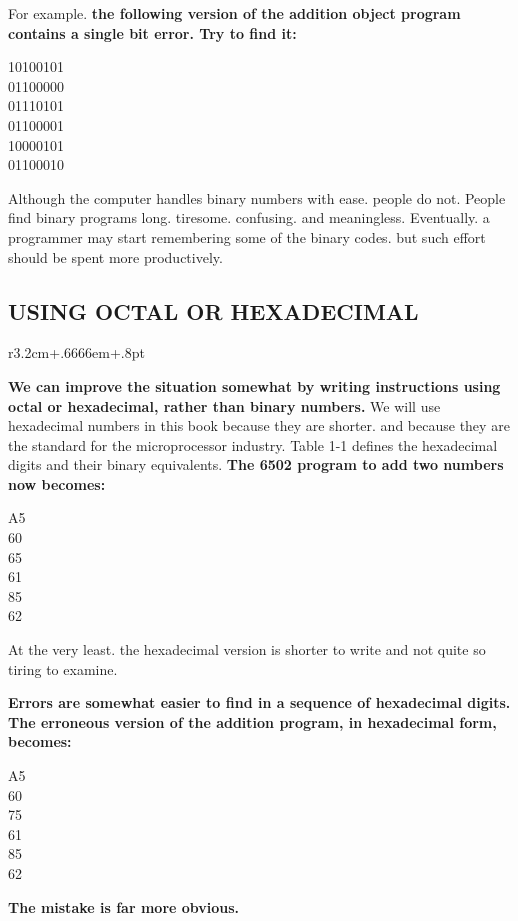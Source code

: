 \documentclass{book}
\begin{document}
For example. \textbf{the following version of the addition object program contains a single bit error. Try to find it:}
\begin{center}
10100101\\
01100000\\
01110101\\
01100001\\
10000101\\
01100010
\end{center}
Although the computer handles binary numbers with ease. people do not. People find binary programs long. tiresome. confusing. and meaningless. Eventually. a programmer may start remembering some of the binary codes. but such effort should be spent more productively.

\subsection*{USING OCTAL OR HEXADECIMAL}
\begin{wrapfigure}{r}{3.2cm+.6666em+.8pt}
\end{wrapfigure}
\textbf{We can improve the situation somewhat by writing instructions using octal or hexadecimal, rather than binary numbers.} We will use hexadecimal numbers in this book because they are shorter. and because they are the standard for the microprocessor industry. Table 1-1 defines the hexadecimal digits and their binary equivalents. \textbf{The 6502 program to add two numbers now becomes:}

\begin{center}
A5\\
60\\
65\\
61\\
85\\
62
\end{center}
At the very least. the hexadecimal version is shorter to write and not quite so tiring to examine.

\textbf{Errors are somewhat easier to find in a sequence of hexadecimal digits. The erroneous version of the addition program, in hexadecimal form, becomes:}
\begin{center}
A5\\
60\\
75\\
61\\
85\\
62
\end{center}
\textbf{The mistake is far more obvious.}
\end{document}

